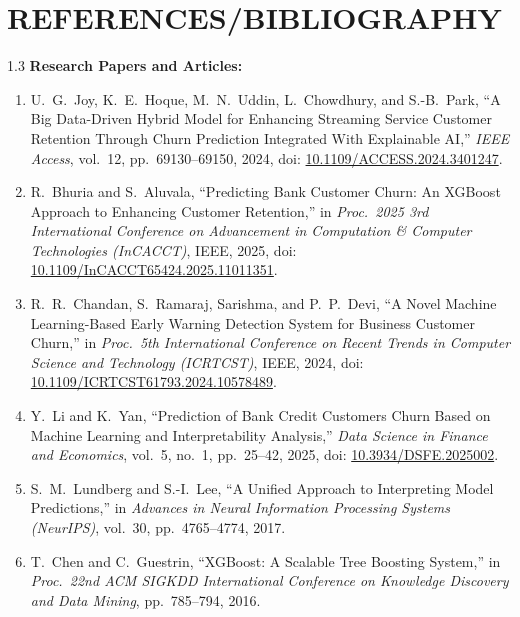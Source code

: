 \documentclass[12pt,a4paper]{article}
\begin{document}
\section{REFERENCES/BIBLIOGRAPHY}\label{chap:13}

\vspace{0.1in}
\begin{spacing}{1.3}
\noindent\textbf{Research Papers and Articles:}
\begin{enumerate}[leftmargin=20pt]
    \item U.\ G.\ Joy, K.\ E.\ Hoque, M.\ N.\ Uddin, L.\ Chowdhury, and S.-B.\ Park, ``A Big Data-Driven Hybrid Model for Enhancing Streaming Service Customer Retention Through Churn Prediction Integrated With Explainable AI,'' \textit{IEEE Access}, vol.\ 12, pp.\ 69130--69150, 2024, doi: \url{10.1109/ACCESS.2024.3401247}.
    \item R.\ Bhuria and S.\ Aluvala, ``Predicting Bank Customer Churn: An XGBoost Approach to Enhancing Customer Retention,'' in \textit{Proc.\ 2025 3rd International Conference on Advancement in Computation \& Computer Technologies (InCACCT)}, IEEE, 2025, doi: \url{10.1109/InCACCT65424.2025.11011351}.
    \item R.\ R.\ Chandan, S.\ Ramaraj, Sarishma, and P.\ P.\ Devi, ``A Novel Machine Learning-Based Early Warning Detection System for Business Customer Churn,'' in \textit{Proc.\ 5th International Conference on Recent Trends in Computer Science and Technology (ICRTCST)}, IEEE, 2024, doi: \url{10.1109/ICRTCST61793.2024.10578489}.
    \item Y.\ Li and K.\ Yan, ``Prediction of Bank Credit Customers Churn Based on Machine Learning and Interpretability Analysis,'' \textit{Data Science in Finance and Economics}, vol.\ 5, no.\ 1, pp.\ 25--42, 2025, doi: \url{10.3934/DSFE.2025002}.
    \item S.\ M.\ Lundberg and S.-I.\ Lee, ``A Unified Approach to Interpreting Model Predictions,'' in \textit{Advances in Neural Information Processing Systems (NeurIPS)}, vol.\ 30, pp.\ 4765--4774, 2017.
    \item T.\ Chen and C.\ Guestrin, ``XGBoost: A Scalable Tree Boosting System,'' in \textit{Proc.\ 22nd ACM SIGKDD International Conference on Knowledge Discovery and Data Mining}, pp.\ 785--794, 2016.
\end{enumerate}


\end{spacing}
\end{document}

